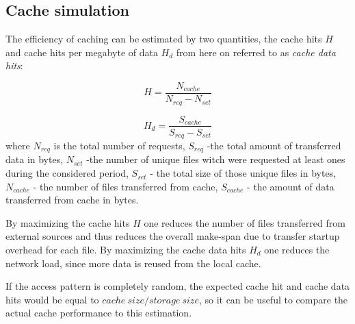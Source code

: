 \documentclass[english]{ddny}
\begin{document}
\subsection{Cache simulation}
The efficiency of caching can be estimated by two quantities, the cache hits $H$ and cache hits per megabyte of data $H_{d}$ from here on referred to as \textit{cache data hits}:

\begin{equation}
\label{hits}
H =\frac{N_{cache}}{N_{req}-N_{set}}
\end{equation}

\begin{equation}
\label{hitsBeq}
H_{d} = \frac{S_{cache}}{S_{req}-S_{set}}
\end{equation}
where $N_{req}$ is the total number of requests, $S_{req}$ -the total amount of transferred data in bytes, $N_{set}$ -the number of unique files witch were requested at least ones during the considered period, $S_{set}$ - the total size of those unique files in bytes, $N_{cache}$ - the number of files transferred from cache, $S_{cache}$ - the amount of data transferred from cache in bytes.

By maximizing the cache hits $H$ one reduces the number of files transferred from external sources and thus reduces the overall make-span due to transfer startup overhead for each file. By maximizing the cache data hits $H_{d}$ one reduces the network load, since more data is reused from the local cache.

If the access pattern is completely random, the expected cache hit and cache data hits would be equal to $cache~size/storage~size$, so it can be useful to compare the actual cache performance to this estimation. 
\end{document}
